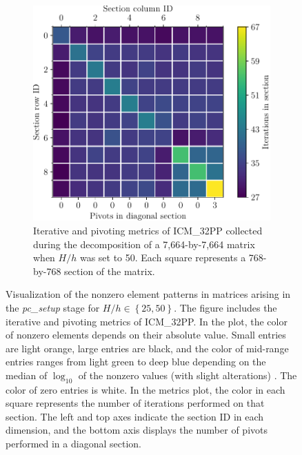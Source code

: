\begin{figure}[ht!]
\begin{subfigure}[t]{0.51\textwidth}
		\includegraphics[width=\textwidth]{images/ch03/input-matrices/bddcml-benchmark/poc-50_4_2_icmxpp_metrics.pdf}
		\caption{Iterative and pivoting metrics of ICM\_32PP collected during the decomposition of a 7,664-by-7,664 matrix when $H/h$ was set to 50. Each square represents a 768-by-768 section of the matrix.}
		\label{Figure:comparing-decomposers-and-solvers->bddcml-benchmark->benchmark-results->speedup-comparison-of-decomposers-in-pc-setup-stage->speedup-comparison->ICM_32PP->50-4-2->metrics}
	\end{subfigure}

	\caption{Visualization of the nonzero element patterns in matrices arising in the \textit{pc\_setup} stage for $H/h \in \left\{25, 50\right\}$. The figure includes the iterative and pivoting metrics of ICM\_32PP. In the  plot, the color of nonzero elements depends on their absolute value. Small entries are light orange, large entries are black, and the color of mid-range entries ranges from light green to deep blue depending on the median of $\log_{10}$ of the nonzero values (with slight alterations) \cite{Davis2006}. The color of zero entries is white. In the metrics plot, the color in each square represents the number of iterations performed on that section. The left and top axes indicate the section ID in each dimension, and the bottom axis displays the number of pivots performed in a diagonal section.}
	\label{Figure:comparing-decomposers-and-solvers->bddcml-benchmark->benchmark-results->speedup-comparison-of-decomposers-in-pc-setup-stage->speedup-comparison->ICM_32PP->LU-and-metrics-examples}
\end{figure}

